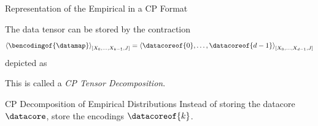 \documentclass{beamer}
\begin{document}
    \begin{frame}{Representation of the Empirical in a CP Format}

        The data tensor can be stored by the contraction
        \[ \contractionof{\bencodingof{\datamap}}{\catvariableof{0},\ldots,\catvariableof{\atomenumerator-1},\datvariable} =
        \contractionof{\datacoreof{0},\ldots,\datacoreof{\atomorder-1}}{\catvariableof{0},\ldots,\catvariableof{\atomorder-1},\datvariable} \]
        depicted as
        \begin{center}
        \end{center}
        This is called a \emph{CP Tensor Decomposition}.

        \begin{block}{CP Decomposition of Empirical Distributions}
            Instead of storing the datacore $\datacore$, store the encodings $\datacoreof{\atomenumerator}$.
        \end{block}

    \end{frame}
\end{document}
